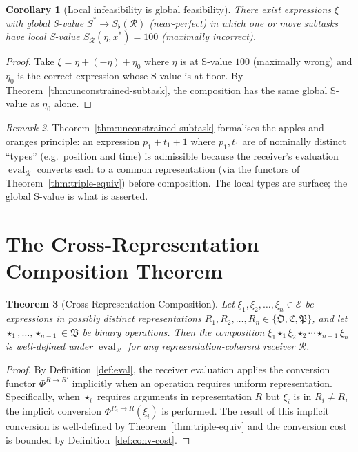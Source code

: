\documentclass[twocolumn,11pt,a4paper]{article}
\theoremstyle{thmstyle}
\newtheorem{theorem}{Theorem}[section]
\newtheorem{corollary}[theorem]{Corollary}
\theoremstyle{thmstyle}
\theoremstyle{definition}
\theoremstyle{remark}
\newtheorem{remark}[theorem]{Remark}
\DeclareMathOperator{\eval}{eval}
\newcommand{\Expr}{\mathcal{E}}
\newcommand{\receiver}{\mathcal{R}}
\newcommand{\Sscalar}{S}
\newcommand{\Sfloor}{S_{\flat}}
\begin{document}
\begin{corollary}[Local infeasibility is global feasibility]
\label{cor:local-infeasibility}
There exist expressions $\xi$ with global S-value
$\Sscalar^{*} \to \Sfloor(\receiver)$ (near-perfect)
in which one or more subtasks have local S-value
$\Sscalar_{\receiver}(\eta, x^{*}) = 100$ (maximally
incorrect).
\end{corollary}

\begin{proof}
Take $\xi = \eta + (-\eta) + \eta_{0}$ where
$\eta$ is at S-value $100$ (maximally wrong) and
$\eta_{0}$ is the correct expression whose
S-value is at floor.  By
Theorem~\ref{thm:unconstrained-subtask}, the
composition has the same global S-value as
$\eta_{0}$ alone.
\end{proof}

\begin{remark}\label{rem:apples-oranges-clean}
Theorem~\ref{thm:unconstrained-subtask} formalises
the apples-and-oranges principle: an expression
$p_{1} + t_{1} + 1$ where $p_{1}, t_{1}$ are of
nominally distinct ``types'' (e.g.\ position and
time) is admissible because the receiver's
evaluation $\eval_{\receiver}$ converts each to
a common representation (via the functors of
Theorem~\ref{thm:triple-equiv}) before composition.
The local types are surface; the global S-value is
what is asserted.
\end{remark}

\section{The Cross-Representation Composition Theorem}
\label{sec:cross-rep-comp}

\begin{theorem}[Cross-Representation Composition]\label{thm:cross-rep}
Let $\xi_{1}, \xi_{2}, \ldots, \xi_{n} \in \Expr$ be
expressions in possibly distinct representations
$R_{1}, R_{2}, \ldots, R_{n} \in \{\mathfrak{O},
\mathfrak{C}, \mathfrak{P}\}$, and let
$\star_{1}, \ldots, \star_{n-1} \in \mathfrak{B}$ be
binary operations.  Then the composition
$\xi_{1} \star_{1} \xi_{2} \star_{2} \cdots \star_{n-1}
\xi_{n}$ is well-defined under
$\eval_{\receiver}$ for any
representation-coherent receiver $\receiver$.
\end{theorem}

\begin{proof}
By Definition~\ref{def:eval}, the receiver evaluation
applies the conversion functor $\Phi^{R \to R'}$
implicitly when an operation requires uniform
representation.  Specifically, when $\star_{i}$ requires
arguments in representation $R$ but $\xi_{i}$ is in
$R_{i} \neq R$, the implicit conversion
$\Phi^{R_{i} \to R}(\xi_{i})$ is performed.  The
result of this implicit conversion is well-defined by
Theorem~\ref{thm:triple-equiv} and the conversion
cost is bounded by Definition~\ref{def:conv-cost}.
\end{proof}
\end{document}
